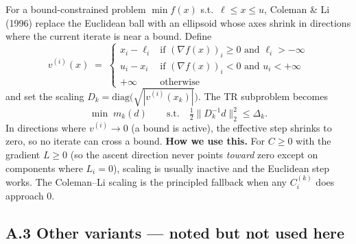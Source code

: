 \documentclass[11pt,a4paper]{article}
\begin{document}
For a bound-constrained problem $\min f(x)$ s.t.\ $\ell \le x \le u$, Coleman \& Li (1996) replace the Euclidean ball with an ellipsoid whose axes shrink in directions where the current iterate is near a bound. Define
\[
v^{(i)}(x) \;=\; \begin{cases} x_i - \ell_i & \text{if } (\nabla f(x))_i \ge 0 \text{ and } \ell_i > -\infty \\ u_i - x_i & \text{if } (\nabla f(x))_i < 0 \text{ and } u_i < +\infty \\ +\infty & \text{otherwise} \end{cases}
\]
and set the scaling $D_k = \mathrm{diag}\big(\sqrt{|v^{(i)}(x_k)|}\big)$. The TR subproblem becomes
\[
\min\; m_k(d)\qquad\text{s.t.}\quad \tfrac12\|D_k^{-1} d\|_2^2 \le \Delta_k.
\]
In directions where $v^{(i)} \to 0$ (a bound is active), the effective step shrinks to zero, so no iterate can cross a bound. \textbf{How we use this.} For $C \ge 0$ with the gradient $L \ge 0$ (so the ascent direction never points \emph{toward} zero except on components where $L_i = 0$), scaling is usually inactive and the Euclidean step works. The Coleman--Li scaling is the principled fallback when any $C_i^{(k)}$ does approach $0$.

\subsection{A.3\; Other variants --- noted but not used here}
\end{document}
